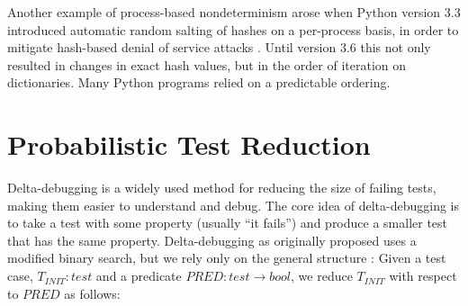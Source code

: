 Another example of process-based nondeterminism arose when Python
version 3.3 introduced automatic random salting of hashes on a
per-process basis,
in order to mitigate hash-based denial of service attacks
\cite{denial}.  Until version 3.6 this not only resulted in changes in
exact hash values, but in the order of iteration on
dictionaries.  Many Python programs
relied on a
predictable ordering.  


\section{Probabilistic Test Reduction}

Delta-debugging \cite{DD}  is a widely used method for reducing the
size of failing tests, making them easier to understand and debug.
The core idea of delta-debugging is to take a test with some
property (usually ``it fails'')
and produce a smaller test that has the same property.
Delta-debugging as originally proposed uses a
modified binary search, but we rely only on the general structure \cite{onetest}:  Given a
test case, $T_{\mathit{INIT}} : \mathit{test}$ and a predicate
$\mathit{PRED}: \mathit{test} \rightarrow \mathit{bool}$, we
reduce $T_{\mathit{INIT}}$ with respect to $\mathit{PRED}$
as follows:

